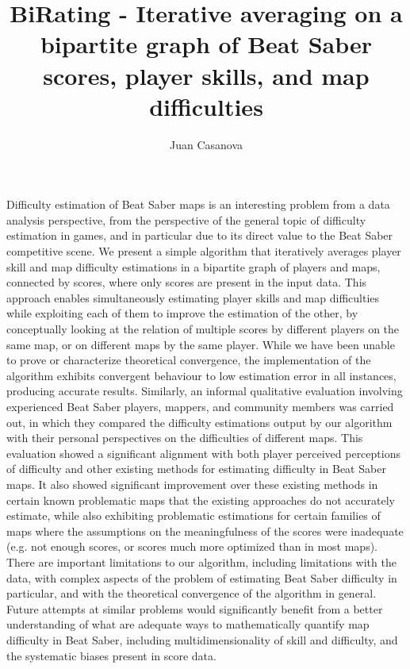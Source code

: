 \documentclass[12pt,a4paper]{article}
\title{BiRating - Iterative averaging on a bipartite graph of Beat Saber scores, player skills, and map difficulties}
\author{Juan Casanova}
\begin{document}
\maketitle

Difficulty estimation of Beat Saber maps is an interesting problem from a data analysis perspective, from the perspective of the general topic of difficulty estimation in games, and in particular due to its direct value to the Beat Saber competitive scene. We present a simple algorithm that iteratively averages player skill and map difficulty estimations in a bipartite graph of players and maps, connected by scores, where only scores are present in the input data. This approach enables simultaneously estimating player skills and map difficulties while exploiting each of them to improve the estimation of the other, by conceptually looking at the relation of multiple scores by different players on the same map, or on different maps by the same player. While we have been unable to prove or characterize theoretical convergence, the implementation of the algorithm exhibits convergent behaviour to low estimation error in all instances, producing accurate results. Similarly, an informal qualitative evaluation involving experienced Beat Saber players, mappers, and community members was carried out, in which they compared the difficulty estimations output by our algorithm with their personal perspectives on the difficulties of different maps. This evaluation showed a significant alignment with both player perceived perceptions of difficulty and other existing methods for estimating difficulty in Beat Saber maps. It also showed significant improvement over these existing methods in certain known problematic maps that the existing approaches do not accurately estimate, while also exhibiting problematic estimations for certain families of maps where the assumptions on the meaningfulness of the scores were inadequate (e.g. not enough scores, or scores much more optimized than in most maps). There are important limitations to our algorithm, including limitations with the data, with complex aspects of the problem of estimating Beat Saber difficulty in particular, and with the theoretical convergence of the algorithm in general. Future attempts at similar problems would significantly benefit from a better understanding of what are adequate ways to mathematically quantify map difficulty in Beat Saber, including multidimensionality of skill and difficulty, and the systematic biases present in score data.

\tableofcontents
\end{document}
